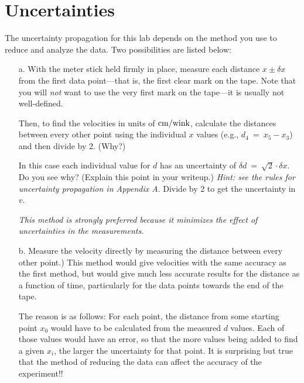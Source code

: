 \section*{Uncertainties}

The uncertainty propagation for this lab depends on the method
you use to reduce and analyze the data.  Two possibilities are listed below:
\begin{itemize}
	\item[a.]  With the meter stick held firmly in place, measure
        each distance $x \pm \delta x$ from the first
	data point---that is, the first clear mark on the tape.  Note
        that you will {\em not} want to use the very first mark on the
        tape---it is usually not well-defined.

        Then, to find the velocities in units of
$\rm{cm}/{\rm wink}$, calculate
        the distances between every other point
 	using the individual $x$ values (e.g., $d_{4} ~=~ x_{5} - x_{3}$)
and then divide by 2. (Why?)
	
	In this case each individual value for $d$ has an uncertainty of
	$\delta d ~=~ \sqrt{2} \cdot \delta x$.  Do you see why?  (Explain
        this point in your writeup.) {\em Hint: see the rules for
        uncertainty propagation in Appendix A}. Divide by 2 to get the uncertainty
in $v$.

        {\em This method is strongly preferred because it minimizes
        the effect of uncertainties in the measurements.}

	\item[b.]  Measure the velocity directly by measuring
        the distance between every other point.)
This method would give velocities with the same accuracy as the
first method, but would give much less accurate results for the
distance as a function of time, particularly for the data points
towards the end of the tape.

The reason is as follows: For each point, the distance from some
starting
point $x_0$ would have to be calculated from the measured $d$ values.
Each of those values would have an error, so that the more values
being added to find a given $x_i$, the larger the uncertainty for that
point.  It is surprising but true that the method of reducing the data
can affect the accuracy of the experiment!!


\end{itemize}
